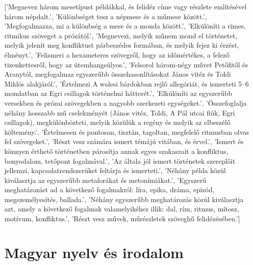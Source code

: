 ['Megnevez három mesetípust példákkal, és felidéz címe vagy részlete említésével három népdalt.', 'Különbséget tesz a népmese és a műmese között.', 'Megfogalmazza, mi a különbség a mese és a monda között.', 'Elkülöníti a rímes, ritmikus szöveget a prózától.', 'Megnevezi, melyik műnem mond el történetet, melyik jelenít meg konfliktust párbeszédes formában, és melyik fejez ki érzést, élményt.', 'Felismeri a hexameteres szövegről, hogy az időmértékes, a felező tizenkettesről, hogy az ütemhangsúlyos.', 'Felsorol három-négy művet Petőfitől és Aranytól, megfogalmaz egyszerűbb  összehasonlításokat János vitéz és Toldi Miklós alakjáról.', 'Értelmezi A walesi bárdokban rejlő allegóriát, és ismerteti 5–6 mondatban az Egri csillagok történelmi hátterét.', 'Elkülöníti az egyszerűbb versekben és prózai szövegekben a nagyobb szerkezeti egységeket.', 'Összefoglalja néhány hosszabb mű cselekményét (János vitéz, Toldi, A Pál utcai fiúk, Egri csillagok), megkülönbözteti, melyik közülük a regény és melyik az elbeszélő költemény.', 'Értelmesen és pontosan, tisztán, tagoltan, megfelelő ritmusban olvas fel szövegeket.', 'Részt vesz számára ismert témájú vitában, és érvel.', 'Ismert és könnyen érthető történetben párosítja annak egyes szakaszait a konfliktus, bonyodalom, tetőpont fogalmával.', 'Az általa jól ismert történetek szereplőit jellemzi, kapcsolatrendszerüket feltárja és ismerteti.', 'Néhány példa közül kiválasztja az egyszerűbb metaforákat és metonímiákat.', 'Egyszerű meghatározást ad a következő fogalmakról: líra, epika, dráma, epizód, megszemélyesítés, ballada.', 'Néhány egyszerűbb meghatározás közül kiválasztja azt, amely a következő fogalmak valamelyikéhez illik: dal, rím, ritmus, mítosz, motívum, konfliktus.', 'Részt vesz művek, műrészletek szöveghű felidézésében.']

    \section{Magyar nyelv és irodalom}

